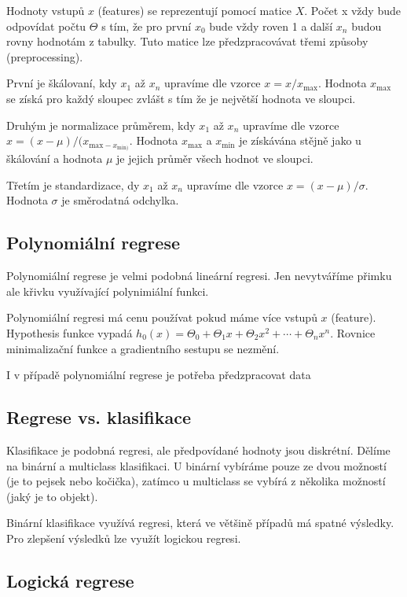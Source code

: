 Hodnoty vstupů $x$ (features) se reprezentují pomocí matice $X$. 
Počet x vždy bude odpovídat počtu $\Theta$ s tím, že pro první $x_0$ bude vždy roven 1 a další $x_n$ budou rovny hodnotám z tabulky.
Tuto matice lze předzpracovávat třemi způsoby (preprocessing).

První je škálovaní, kdy $x_1$ až $x_n$ upravíme dle vzorce $x = x/x_{\text{max}}$. 
Hodnota $x_{\text{max}}$ se získá pro každý sloupec zvlášt s tím že je největší hodnota ve sloupci.

Druhým je normalizace průměrem, kdy $x_1$ až $x_n$ upravíme dle vzorce $x = (x - \mu)/(x_{\text{max} - x_{\text{min})}}$. 
Hodnota $x_{\text{max}}$ a $x_{\text{min}}$ je získávána stějně jako u škálování a hodnota $\mu$ je jejich průměr všech hodnot ve sloupci.

Třetím je standardizace, dy $x_1$ až $x_n$ upravíme dle vzorce $x = (x - \mu)/\sigma$.
Hodnota $\sigma$ je směrodatná odchylka. 

\subsection{Polynomiální regrese}

Polynomiální regrese je velmi podobná lineární regresi.
Jen nevytváříme přimku ale křivku využívající polynimiální funkci.

Polynomiální regresi má cenu používat pokud máme více vstupů $x$ (feature).
Hypothesis funkce vypadá $h_0(x) = \Theta_0 + \Theta_1 x + \Theta_2 x^2 + \dotsb + \Theta_n x^n$.
Rovnice minimalizační funkce a gradientního sestupu se nezmění.

I v případě polynomiální regrese je potřeba předzpracovat data

\subsection{Regrese vs. klasifikace}

Klasifikace je podobná regresi, ale předpovídané hodnoty jsou diskrétní.
Dělíme na binární a multiclass klasifikaci.
U binární vybíráme pouze ze dvou možností (je to pejsek nebo kočička), zatímco u multiclass se vybírá z několika možností (jaký je to objekt).

Binární klasifikace využívá regresi, která ve většině případů má spatné výsledky.
Pro zlepšení výsledků lze využít logickou regresi.

\subsection{Logická regrese}

